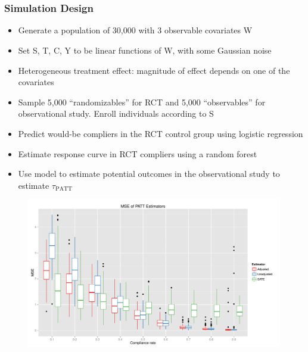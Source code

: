 \documentclass{beamer}
\begin{document}
\section[Simulation]{}


\begin{frame}
\frametitle{Simulation Design}
\begin{itemize}
\item Generate a population of 30,000 with 3 observable covariates W
\item Set S, T, C, Y to be linear functions of W, with some Gaussian noise
\item Heterogeneous treatment effect: magnitude of effect depends on one of the covariates
\item Sample 5,000 ``randomizables'' for RCT and 5,000 ``observables'' for observational study. Enroll individuals according to S
\item Predict would-be compliers in the RCT control group using logistic regression
\item Estimate response curve in RCT compliers using a random forest
\item Use model to estimate potential outcomes in the observational study to estimate $\tau_{\text{PATT}}$
\end{itemize}
\end{frame}

\begin{frame}
\begin{figure}[htbp]
\centering
   \includegraphics[width=\linewidth]{../paper/mse_boxplots_B5.pdf} 
\label{simulation-plot}
\end{figure}
\end{frame}
\end{document}
